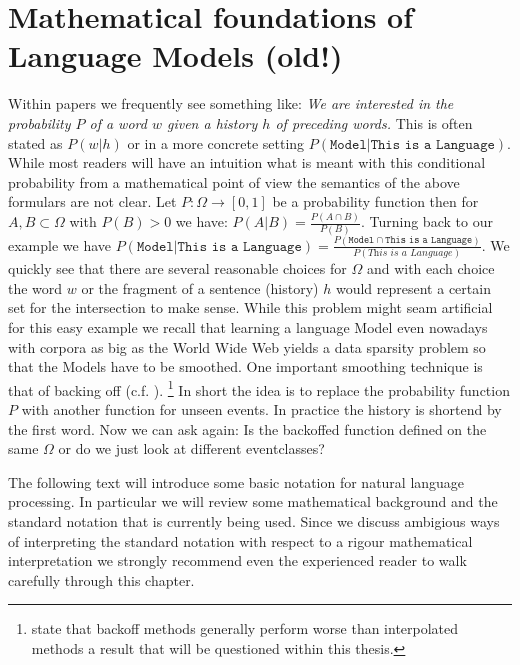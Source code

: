 \documentclass[•]{book}
\begin{document}

\chapter{Mathematical foundations of Language Models (old!)}

Within papers we frequently see something like: \textit{We are interested in the probability $P$ of a word $w$ given a history $h$ of preceding words.}
This is often stated as $P(w|h)$ or in a more concrete setting $P(\texttt{Model}|\texttt{This is a Language})$. 
While most readers will have an intuition what is meant with this conditional probability from a mathematical point of view the semantics of the above formulars are not clear.
Let $P:\Omega \rightarrow [0,1]$ be a probability function then for $A,B \subset \Omega$ with $P(B)>0$ we have: $P(A|B)=\frac{P(A\cap B)}{P(B)}$.
Turning back to our example we have $P(\texttt{Model}|\texttt{This is a Language}) = \frac{P(\texttt{Model}\cap\texttt{This is a Language})}{P(\textit{This is a Language})}$.
We quickly see that there are several reasonable choices for $\Omega$ and with each choice the word $w$ or the fragment of a sentence (history) $h$ would represent a certain set for the intersection to make sense.
While this problem might seam artificial for this easy example we recall that learning a language Model even nowadays with corpora as big as the World Wide Web yields a data sparsity problem so that the Models have to be smoothed. 
One important smoothing technique is that of backing off (c.f. \cite{katz}\cite{kneser:ney:1994}). \footnote{\cite{chen:goodman} state that backoff methods generally perform worse than interpolated methods a result that will be questioned within this thesis.}
In short the idea is to replace the probability function $P$ with another function for unseen events. 
In practice the history is shortend by the first word. 
Now we can ask again: Is the backoffed function defined on the same $\Omega$ or do we just look at different eventclasses?

The following text will introduce some basic notation for natural language processing. 
In particular we will review some mathematical background and the standard notation that is currently being used.
Since we discuss ambigious ways of interpreting the standard notation with respect to a rigour mathematical interpretation  we strongly recommend even the experienced reader to walk carefully through this chapter. 
\end{document}
